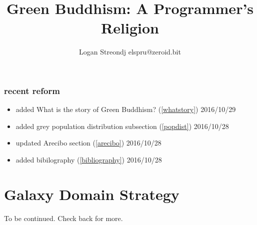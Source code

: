 \documentclass{report}
\title{Green Buddhism: A Programmer's Religion}
\author{Logan Streondj elspru@zeroid.bit}
\begin{document}
\section{recent reform}
\begin{itemize}
  \item added What is the story of Green Buddhism? (\ref{whatstory}) 2016/10/29
  \item added grey population distribution subsection (\ref{popdist})
2016/10/28
 \item updated Arecibo section (\ref{arecibo}) 2016/10/28
 \item added bibilography (\ref{bibliography}) 2016/10/28
\end{itemize}

\tableofcontents
 

\part{Galaxy Domain Strategy}








To be continued.
Check back for more.
\end{document}
